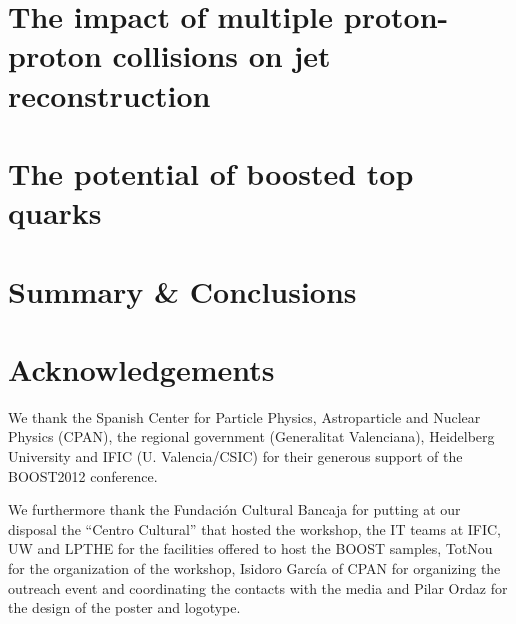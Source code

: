 \documentclass[twocolumn,epjc]{svjour3}
\begin{document}
\section{The impact of multiple proton-proton collisions on jet reconstruction}
\label{sec:pileup1}
  

%  


\section{The potential of boosted top quarks}
\label{sec:top}


\section{Summary \& Conclusions}
\label{sec:conclusions}

\section*{Acknowledgements}


We thank the Spanish Center for Particle Physics, Astroparticle and 
Nuclear Physics (CPAN), 
the regional government (Generalitat Valenciana), Heidelberg University 
and IFIC (U. Valencia/CSIC) for their generous support of the BOOST2012
conference. 

We furthermore thank the Fundaci\'on Cultural Bancaja for putting 
at our disposal 
the ``Centro Cultural'' that hosted the workshop, the IT 
teams at IFIC, UW and LPTHE for the facilities offered to host
the BOOST samples, TotNou for the organization of the workshop, 
Isidoro Garc\'ia of CPAN for organizing the outreach event 
and coordinating the contacts with the media and 
Pilar Ordaz for the design of the poster and logotype.
\end{document}
